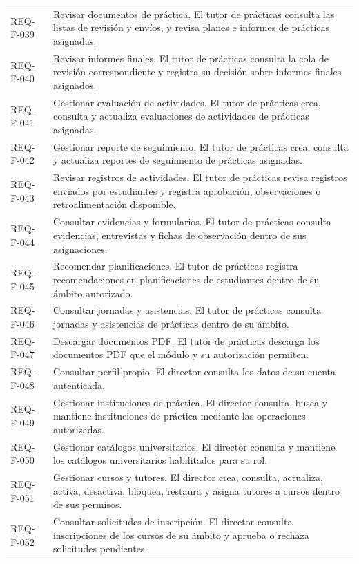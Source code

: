 \documentclass[11pt,a4paper]{article}
\begin{document}
{\begin{longtable}{@{}P{2.5cm}P{12.6cm}@{}}
REQ-F-039 & Revisar documentos de práctica. El tutor de prácticas consulta las listas de revisión y envíos, y revisa planes e informes de prácticas asignadas.\\
REQ-F-040 & Revisar informes finales. El tutor de prácticas consulta la cola de revisión correspondiente y registra su decisión sobre informes finales asignados.\\
REQ-F-041 & Gestionar evaluación de actividades. El tutor de prácticas crea, consulta y actualiza evaluaciones de actividades de prácticas asignadas.\\
REQ-F-042 & Gestionar reporte de seguimiento. El tutor de prácticas crea, consulta y actualiza reportes de seguimiento de prácticas asignadas.\\
REQ-F-043 & Revisar registros de actividades. El tutor de prácticas revisa registros enviados por estudiantes y registra aprobación, observaciones o retroalimentación disponible.\\
REQ-F-044 & Consultar evidencias y formularios. El tutor de prácticas consulta evidencias, entrevistas y fichas de observación dentro de sus asignaciones.\\
REQ-F-045 & Recomendar planificaciones. El tutor de prácticas registra recomendaciones en planificaciones de estudiantes dentro de su ámbito autorizado.\\
REQ-F-046 & Consultar jornadas y asistencias. El tutor de prácticas consulta jornadas y asistencias de prácticas dentro de su ámbito.\\
REQ-F-047 & Descargar documentos PDF. El tutor de prácticas descarga los documentos PDF que el módulo y su autorización permiten.\\
REQ-F-048 & Consultar perfil propio. El director consulta los datos de su cuenta autenticada.\\
REQ-F-049 & Gestionar instituciones de práctica. El director consulta, busca y mantiene instituciones de práctica mediante las operaciones autorizadas.\\
REQ-F-050 & Gestionar catálogos universitarios. El director consulta y mantiene los catálogos universitarios habilitados para su rol.\\
REQ-F-051 & Gestionar cursos y tutores. El director crea, consulta, actualiza, activa, desactiva, bloquea, restaura y asigna tutores a cursos dentro de sus permisos.\\
REQ-F-052 & Consultar solicitudes de inscripción. El director consulta inscripciones de los cursos de su ámbito y aprueba o rechaza solicitudes pendientes.\\

\end{longtable}}
\end{document}
